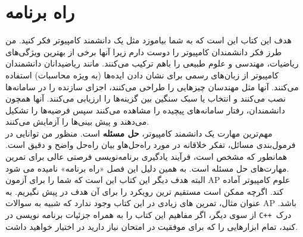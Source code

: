 


\chapter{راه برنامه}


هدف این کتاب این است که به شما بیاموزد مثل یک دانشمند کامپیوتر فکر کنید. من طرز فکر دانشمندان کامپیوتر را دوست دارم زیرا آنها برخی از بهترین ویژگی‌های ریاضیات، مهندسی و علوم طبیعی را باهم ترکیب می‌کنند. مانند ریاضیدانان دانشمندان کامپیوتر از زبان‌های رسمی برای نشان دادن ایده‌ها (به ویژه محاسبات) استفاده می‌کنند. آنها مثل مهندسان چیزهایی را طراحی می‌کنند، اجزای سازنده را در سامانه‌ها نصب  می‌کنند و انتخاب یا سبک سنگین بین گزینه‌ها را ارزیابی می‌کنند. آنها همچون دانشمندان، رفتار  سامانه‌های پیچیده را مشاهده می‌کنند سپس فرضیه‌ها را تشکیل می‌دهند و پیش بینی‌ها را آزمایش می‌کنند.
\\
مهم‌ترین مهارت یک دانشمند کامپیوتر، \textbf{حل مسئله} است.
منظور من توانایی در فرمول‌بندی مسائل، تفکر خلاقانه در مورد راه‌حل‌هاو بیان راه‌حل واضح و دقیق است. همانطور که مشخص است، فرآیند یادگیری برنامه‌نویسی فرصتی عالی برای تمرین مهارت‌های حل مسئله است. به همین دلیل این فصل «راه برنامه» نامیده می شود.
\\

البته هدف دیگر این کتاب این است که شما را برای آزمون AP علوم کامپیوتر آماده کند. اگرچه ممکن است مستقیم ترین رویکرد را برای آن هدف در پیش نگیریم. به عنوان مثال، تمرین های زیادی در این کتاب وجود ندارد که شبیه به سوالات AP باشد. از سوی دیگر، اگر مفاهیم این کتاب را به همراه جزئیات برنامه نویسی در \texttt{C++ }درک کنید، تمام ابزارهایی را که برای موفقیت در امتحان نیاز دارید در اختیار خواهید داشت.

